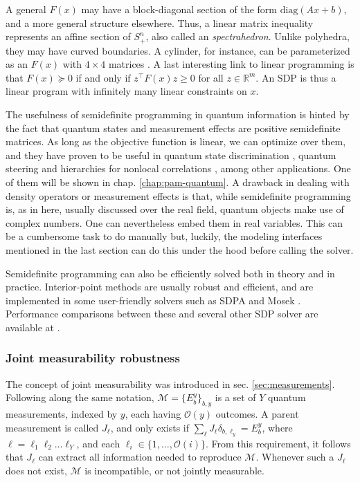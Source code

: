 			A general $F(x)$ may have a block-diagonal section of the form $\text{diag}(Ax + b)$, and a more general structure elsewhere. Thus, a linear matrix inequality represents an affine section of $S_+^n$, also called an \emph{spectrahedron}. Unlike polyhedra, they may have curved boundaries. A cylinder, for instance, can be parameterized as an $F(x)$ with $4 \times 4$ matrices \cite{vinzant_spectrahedron_2014}. A last interesting link to linear programming is that $F(x) \succeq 0$ if and only if $z^\intercal F(x) z \geq 0$ for all $z \in \mathbb{R}^m$. An SDP is thus a linear program with infinitely many linear constraints on $x$.

			The usefulness of semidefinite programming in quantum information is hinted by the fact that quantum states and measurement effects are positive semidefinite matrices. As long as the objective function is linear, we can optimize over them, and they have proven to be useful in quantum state discrimination \cite{bae_discrimination_2015}, quantum steering \cite{cavalcanti_2016_steering} and hierarchies for nonlocal correlations \cite{npa_prl_2007,npa_njp_2008}, among other applications. One of them will be shown in chap. \ref{chap:pam-quantum}. A drawback in dealing with density operators or measurement effects is that, while semidefinite programming is, as in here, usually discussed over the real field, quantum objects make use of complex numbers. One can nevertheless embed them in real variables. This can be a cumbersome task to do manually but, luckily, the modeling interfaces mentioned in the last section can do this under the hood before calling the solver.

			Semidefinite programming can also be efficiently solved both in theory and in practice. Interior-point methods are usually robust and efficient, and are implemented in some user-friendly solvers such as SDPA \cite{sdpa} and Mosek \cite{mosek}. Performance comparisons between these and several other SDP solver are available at \cite{performance_sdp_solvers}.


			\subsubsection{Joint measurability robustness}
			\label{sec:incompatibility-robustness}

				The concept of joint measurability was introduced in sec. \ref{sec:measurements}. Following along the same notation, $\mathcal{M} = \{E_b^y \}_{b, y}$ is a set of $Y$ quantum measurements, indexed by $y$, each having $\mathcal{O}(y)$ outcomes. A parent measurement is called $J_\ell$, and only exists if $\sum_\ell J_\ell \delta_{b, \ell_y} = E_b^y$, where $\ell = \ell_1\ell_2\ldots\ell_Y$, and each $\ell_i \in \{ 1, \ldots, \mathcal{O}(i) \}$. From this requirement, it follows that $J_\ell$ can extract all information needed to reproduce $\mathcal{M}$. Whenever such a $J_\ell$ does not exist, $\mathcal{M}$ is incompatible, or not jointly measurable.

